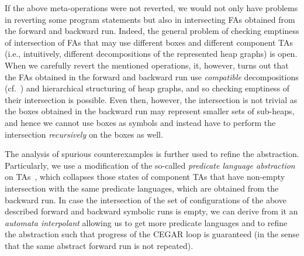 If the above meta-operations were not reverted, we would not only have problems
in reverting some program statements but also in intersecting FAs obtained from
the forward and backward run. Indeed, the general problem of checking emptiness
of intersection of FAs that may use different boxes and different component TAs
(i.e., intuitively, different decompositions of the represented heap graphs) is
open. When we carefully revert the mentioned operations, it, however, turns out
that the FAs obtained in the forward and backward run use \emph{compatible}
decompositions (cf.~) and hierarchical structuring of heap graphs, and so checking
emptiness of their intersection is possible. Even then, however, the
intersection is not trivial as the boxes obtained in the backward run may
represent smaller sets of sub-heaps, and hence we cannot use boxes as symbols
and instead have to perform the intersection \emph{recursively} on the boxes as
well.

The analysis of spurious counterexamples is further used to refine the abstraction. 
%
Particularly, we use a modification of the so-called \emph{predicate
language abstraction} on TAs~\cite{artmc}, which 
collapses those states of component TAs that
have non-empty intersection with the same predicate languages, which are
obtained from the backward run.
%
In case the intersection of the set of configurations of the above described forward and backward symbolic runs
is empty, we can derive from it an \emph{automata interpolant} allowing us to
get more predicate languages and to refine the abstraction such that progress of
the CEGAR loop is guaranteed (in the sense that the same
abstract forward run is not repeated).

% 
%
%


